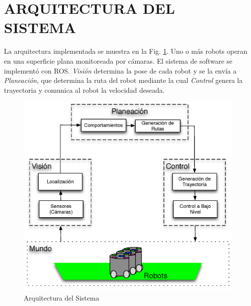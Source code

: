 \documentclass[twocolumn,10pt]{amrob}
\newcommand{\TODO}[1]{{\color{red}{ToDo: {#1}}}}
\begin{document}
\section*{ARQUITECTURA DEL SISTEMA}
\label{sex:arquitectura_sistema}

La arquitectura implementada se muestra en la Fig. \ref{fig:ROSGral}. Uno o más robots operan en una superficie plana monitoreada por cámaras. El sistema de software se implementó con ROS. \emph{Visión} determina la pose de cada robot y se la envía a \emph{Planeación}, que determina la ruta del robot mediante la cual \emph{Control} genera la trayectoria y comunica al robot la velocidad deseada. 

\begin{figure}
  \centering
    \includegraphics[scale=.5]{arqGeneral.eps}
  \caption{Arquitectura del Sistema}
  \label{fig:ROSGral}
\end{figure}
\end{document}

